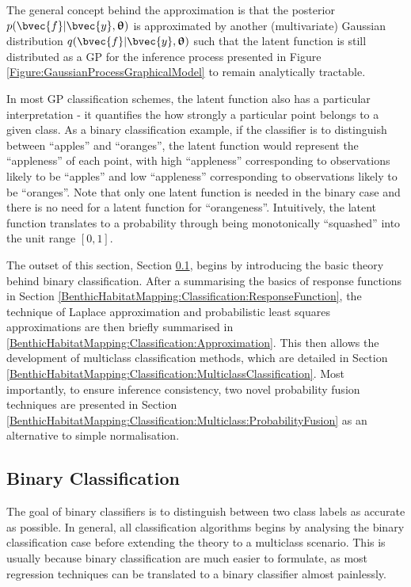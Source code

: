 		The general concept behind the approximation is that the posterior $p(\bvec{f} | \bvec{y}, \vec{\uptheta})$ is approximated by another (multivariate) Gaussian distribution $q(\bvec{f} | \bvec{y}, \vec{\uptheta})$ such that the latent function is still distributed as a GP for the inference process presented in Figure \ref{Figure:GaussianProcessGraphicalModel} to remain analytically tractable.
		
		In most GP classification schemes, the latent function also has a particular interpretation - it quantifies the how strongly a particular point belongs to a given class. As a binary classification example, if the classifier is to distinguish between ``apples'' and ``oranges'', the latent function would represent the ``appleness'' of each point, with high ``appleness'' corresponding to observations likely to be ``apples'' and low ``appleness'' corresponding to observations likely to be ``oranges''. Note that only one latent function is needed in the binary case and there is no need for a latent function for ``orangeness''. Intuitively, the latent function translates to a probability through being monotonically ``squashed'' into the unit range $[0, 1]$.
		
		The outset of this section, Section \ref{BenthicHabitatMapping:Classification:BinaryClassification}, begins by introducing the basic theory behind binary classification. After a summarising the basics of response functions in Section \ref{BenthicHabitatMapping:Classification:ResponseFunction}, the technique of Laplace approximation and probabilistic least squares approximations are then briefly summarised in \ref{BenthicHabitatMapping:Classification:Approximation}. This then allows the development of multiclass classification methods, which are detailed in Section \ref{BenthicHabitatMapping:Classification:MulticlassClassification}. Most importantly, to ensure inference consistency, two novel probability fusion techniques are presented in Section \ref{BenthicHabitatMapping:Classification:Multiclass:ProbabilityFusion} as an alternative to simple normalisation.
		
		\subsection{Binary Classification}
		\label{BenthicHabitatMapping:Classification:BinaryClassification}
			
			The goal of binary classifiers is to distinguish between two class labels as accurate as possible. In general, all classification algorithms begins by analysing the binary classification case before extending the theory to a multiclass scenario. This is usually because binary classification are much easier to formulate, as most regression techniques can be translated to a binary classifier almost painlessly.
			
